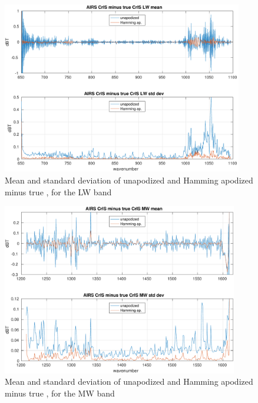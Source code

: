 \documentclass[11pt]{article}
\begin{document}

\begin{figure} %
  \centering
  \includegraphics[height=7.5cm]{figures/a2cris_diff_LW.pdf}
  \caption{Mean and standard deviation of unapodized and Hamming
    apodized {\airs} {\cris} minus true {\cris}, for the {\cris} LW
    band}
  \label{diffLW}
\end{figure}

\begin{figure} %
  \centering
  \includegraphics[height=7.5cm]{figures/a2cris_diff_MW.pdf}
  \caption{Mean and standard deviation of unapodized and Hamming
    apodized {\airs} {\cris} minus true {\cris}, for the {\cris} MW
    band}
  \label{diffMW}
\end{figure}
\end{document}
